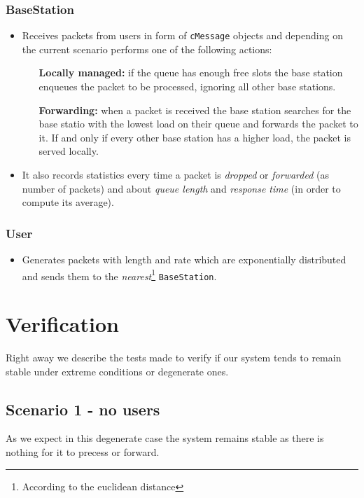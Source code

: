 \documentclass{report}
\begin{document}
\subsection{BaseStation}
\begin{itemize}
    \item Receives packets from users in form of \texttt{cMessage} objects and depending on the current scenario performs one of the following actions:
    \begin{itemize}
        \item [\textbf{Locally managed:}] if the queue has enough free slots the base station enqueues the packet to be processed, ignoring all other base stations.
        \item [\textbf{Forwarding:}] when a packet is received the base station searches for the base statio with the lowest load on their queue and forwards the packet to it. If and only if every other base station has a higher load, the packet is served locally.
    \end{itemize}
    \item It also records statistics every time a packet is \textit{dropped} or \textit{forwarded} (as number of packets) and about \textit{queue length} and \textit{response time} (in order to compute its average).
\end{itemize}

\subsection{User}
\begin{itemize}
    \item Generates packets with length and rate which are exponentially distributed and sends them to the \textit{nearest}\footnote{According to the euclidean distance}
    \texttt{BaseStation}.
\end{itemize}

\chapter{Verification}
Right away we describe the tests made to verify if our system tends to remain stable under extreme conditions or degenerate ones.

\section{Scenario 1 - no users}
As we expect in this degenerate case the system remains stable as there is nothing for it to precess or forward.
\end{document}
